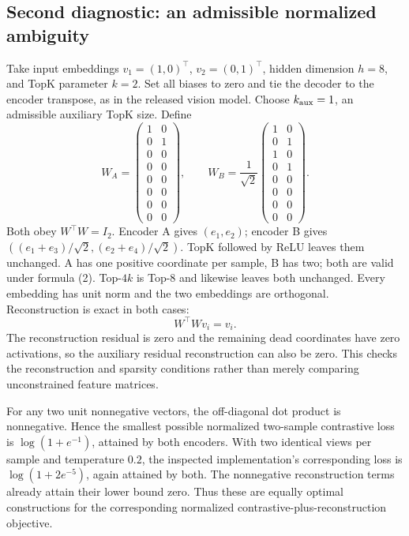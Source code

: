 \documentclass[10pt]{article}
\begin{document}
\subsection*{Second diagnostic: an admissible normalized ambiguity}
Take input embeddings \(v_1=(1,0)^\top\), \(v_2=(0,1)^\top\), hidden dimension \(h=8\), and TopK parameter \(k=2\). Set all biases to zero and tie the decoder to the encoder transpose, as in the released vision model. Choose \(k_{\rm aux}=1\), an admissible auxiliary TopK size. Define \[W_A=\begin{pmatrix}1&0\\0&1\\0&0\\0&0\\0&0\\0&0\\0&0\\0&0\end{pmatrix},
 \qquad
 W_B=\frac1{\sqrt2}
 \begin{pmatrix}1&0\\0&1\\1&0\\0&1\\0&0\\0&0\\0&0\\0&0\end{pmatrix}.\] Both obey \(W^\top W=I_2\). Encoder A gives \((e_1,e_2)\); encoder B gives \(((e_1+e_3)/\sqrt2,(e_2+e_4)/\sqrt2)\). TopK followed by ReLU leaves them unchanged. A has one positive coordinate per sample, B has two; both are valid under formula (2). Top-\(4k\) is Top-8 and likewise leaves both unchanged. Every embedding has unit norm and the two embeddings are orthogonal. Reconstruction is exact in both cases: \[W^\top Wv_i=v_i.\] The reconstruction residual is zero and the remaining dead coordinates have zero activations, so the auxiliary residual reconstruction can also be zero. This checks the reconstruction and sparsity conditions rather than merely comparing unconstrained feature matrices.\par
For any two unit nonnegative vectors, the off-diagonal dot product is nonnegative. Hence the smallest possible normalized two-sample contrastive loss is \(\log(1+e^{-1})\), attained by both encoders. With two identical views per sample and temperature \(0.2\), the inspected implementation’s corresponding loss is \(\log(1+2e^{-5})\), again attained by both. The nonnegative reconstruction terms already attain their lower bound zero. Thus these are equally optimal constructions for the corresponding normalized contrastive-plus-reconstruction objective.\par
\end{document}
